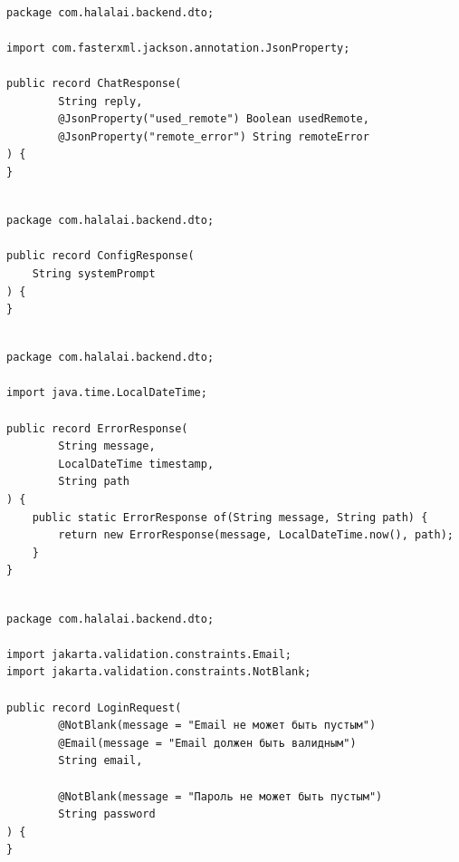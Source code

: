 \begin{lstlisting}[basicstyle=\tiny\ttfamily,breaklines=true]

package com.halalai.backend.dto;

import com.fasterxml.jackson.annotation.JsonProperty;

public record ChatResponse(
        String reply,
        @JsonProperty("used_remote") Boolean usedRemote,
        @JsonProperty("remote_error") String remoteError
) {
}
\end{lstlisting}

\begin{lstlisting}[basicstyle=\tiny\ttfamily,breaklines=true]

package com.halalai.backend.dto;

public record ConfigResponse(
    String systemPrompt
) {
}
\end{lstlisting}

\begin{lstlisting}[basicstyle=\tiny\ttfamily,breaklines=true]

package com.halalai.backend.dto;

import java.time.LocalDateTime;

public record ErrorResponse(
        String message,
        LocalDateTime timestamp,
        String path
) {
    public static ErrorResponse of(String message, String path) {
        return new ErrorResponse(message, LocalDateTime.now(), path);
    }
}
\end{lstlisting}

\begin{lstlisting}[basicstyle=\tiny\ttfamily,breaklines=true]

package com.halalai.backend.dto;

import jakarta.validation.constraints.Email;
import jakarta.validation.constraints.NotBlank;

public record LoginRequest(
        @NotBlank(message = "Email не может быть пустым")
        @Email(message = "Email должен быть валидным")
        String email,

        @NotBlank(message = "Пароль не может быть пустым")
        String password
) {
}
\end{lstlisting}


